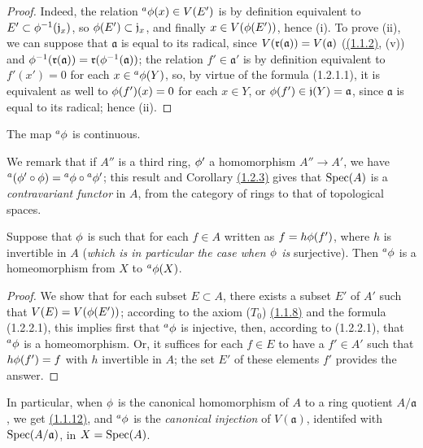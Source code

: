 \begin{proof}
\label{proof-prop-1.1.2.2}
Indeed, the relation ${}^a\phi(x)\in V(E')$ is by definition equivalent to
$E'\subset\phi^{-1}(\mathfrak{j}_x)$, so $\phi(E')\subset\mathfrak{j}_x$, and
finally $x\in V(\phi(E'))$, hence (i). To prove (ii), we can suppose that
$\mathfrak{a}$ is equal to its radical, since $V(\mathfrak{r}(\mathfrak{a}))=V(\mathfrak{a})$
(\hyperref[prop-1.1.1.2]{(1.1.2)}, (v)) and
$\phi^{-1}(\mathfrak{r}(\mathfrak{a}))=\mathfrak{r}(\phi^{-1}(\mathfrak{a}))$; the relation
$f'\in\mathfrak{a}'$ is by definition equivalent to $f'(x')=0$ for each
$x\in{{}^a\phi(Y)}$, so, by virtue of the formula (1.2.1.1), it is equivalent as well
to $\phi(f')(x)=0$ for each $x\in Y$, or $\phi(f')\in\mathfrak{j}(Y)=\mathfrak{a}$,
since $\mathfrak{a}$ is equal to its radical; hence (ii).
\end{proof}

\begin{cor}[1.2.3]
\label{cor-1.1.2.3}
The map ${}^a\phi$ is continuous.
\end{cor}

We remark that if $A''$ is a third ring, $\phi'$ a homomorphism $A''\to A'$, we have
${}^a(\phi'\circ\phi)={}^a\phi\circ{}^a\phi'$; this result and Corollary
\hyperref[cor-1.1.2.3]{(1.2.3)} gives that ${\mathop{\mathrm{Spec}}\nolimits}(A)$ is a {\it contravariant functor} in $A$, from the
category of rings to that of topological spaces.

\begin{cor}[1.2.4]
\label{cor-1.1.2.4}
Suppose that $\phi$ is such that for each $f\in A$ written as $f=h\phi(f')$, where $h$ is
invertible in $A$ ({\it which is in particular the case when $\phi$ is} surjective). Then
${}^a\phi$ is a homeomorphism from $X$ to ${}^a\phi(X)$.
\end{cor}

\begin{proof}
\label{proof-cor-1.1.2.4}
We show that for each subset $E\subset A$, there exists a subset $E'$ of $A'$ such that
$V(E)=V(\phi(E'))$; according to the axiom ($T_0$) \hyperref[cor-1.1.1.8]{(1.1.8)} and the formula
(1.2.2.1), this implies first that ${}^a\phi$ is injective, then, according to (1.2.2.1),
that ${}^a\phi$ is a homeomorphism. Or, it suffices for each $f\in E$ to have a $f'\in A'$
such that $h\phi(f')=f$ with $h$ invertible in $A$; the set $E'$ of these elements $f'$
provides the answer.
\end{proof}

\begin{env}[1.2.5]
\label{env-1.1.2.5}
In particular, when $\phi$ is the canonical homomorphism of $A$ to a ring quotient
$A/\mathfrak{a}$, we get \hyperref[cor-1.1.1.12]{(1.1.12)}, and ${}^a\phi$ is the
{\it canonical injection} of $V(\mathfrak{a})$, identifed with ${\mathop{\mathrm{Spec}}\nolimits}(A/\mathfrak{a})$,
in $X={\mathop{\mathrm{Spec}}\nolimits}(A)$.
\end{env}

